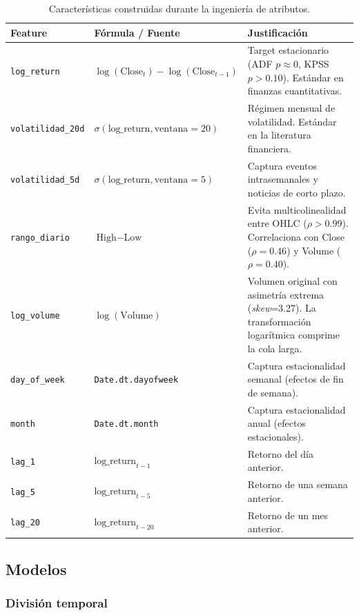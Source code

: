\documentclass[12pt,a4paper]{article}
\begin{document}
\begin{table}[H]
\centering
\caption{Características construidas durante la ingeniería de atributos.}
\label{tab:features}
\small
\begin{tabular}{p{2.5cm}p{3.5cm}p{6.5cm}}
\toprule
\textbf{Feature} & \textbf{Fórmula / Fuente} & \textbf{Justificación} \\
\midrule
\texttt{log\_return} & $\log(\text{Close}_t) - \log(\text{Close}_{t-1})$ & Target estacionario (ADF $p\approx 0$, KPSS $p>0.10$). Estándar en finanzas cuantitativas. \\
\texttt{volatilidad\_20d} & $\sigma(\text{log\_return}, \text{ventana}=20)$ & Régimen mensual de volatilidad. Estándar en la literatura financiera. \\
\texttt{volatilidad\_5d} & $\sigma(\text{log\_return}, \text{ventana}=5)$ & Captura eventos intrasemanales y noticias de corto plazo. \\
\texttt{rango\_diario} & $\text{High} - \text{Low}$ & Evita multicolinealidad entre OHLC ($\rho > 0.99$). Correlaciona con Close ($\rho=0.46$) y Volume ($\rho=0.40$). \\
\texttt{log\_volume} & $\log(\text{Volume})$ & Volumen original con asimetría extrema (\textit{skew}=3.27). La transformación logarítmica comprime la cola larga. \\
\texttt{day\_of\_week} & \texttt{Date.dt.dayofweek} & Captura estacionalidad semanal (efectos de fin de semana). \\
\texttt{month} & \texttt{Date.dt.month} & Captura estacionalidad anual (efectos estacionales). \\
\texttt{lag\_1} & $\text{log\_return}_{t-1}$ & Retorno del día anterior. \\
\texttt{lag\_5} & $\text{log\_return}_{t-5}$ & Retorno de una semana anterior. \\
\texttt{lag\_20} & $\text{log\_return}_{t-20}$ & Retorno de un mes anterior. \\
\bottomrule
\end{tabular}
\end{table}

\subsection{Modelos}

\subsubsection{División temporal}
\end{document}
